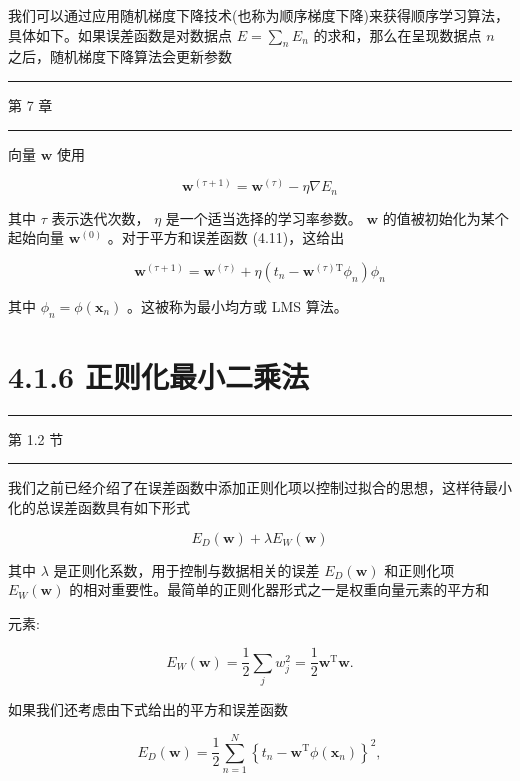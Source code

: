 \documentclass[10pt]{article}
\newcommand{\HRule}{\begin{center}\rule{0.9\linewidth}{0.2mm}\end{center}}
\begin{document}
我们可以通过应用随机梯度下降技术(也称为顺序梯度下降)来获得顺序学习算法，具体如下。如果误差函数是对数据点 \(E = \mathop{\sum }\limits_{n}{E}_{n}\) 的求和，那么在呈现数据点 \(n\) 之后，随机梯度下降算法会更新参数

\HRule

第 7 章

\HRule

向量 \(\mathbf{w}\) 使用

\[
{\mathbf{w}}^{\left( \tau  + 1\right) } = {\mathbf{w}}^{\left( \tau \right) } - \eta \nabla {E}_{n} \tag{4.21}
\]

其中 \(\tau\) 表示迭代次数， \(\eta\) 是一个适当选择的学习率参数。 \(\mathbf{w}\) 的值被初始化为某个起始向量 \({\mathbf{w}}^{\left( 0\right) }\) 。对于平方和误差函数 (4.11)，这给出

\[
{\mathbf{w}}^{\left( \tau  + 1\right) } = {\mathbf{w}}^{\left( \tau \right) } + \eta \left( {{t}_{n} - {\mathbf{w}}^{\left( \tau \right) \mathrm{T}}{\phi }_{n}}\right) {\phi }_{n} \tag{4.22}
\]

其中 \({\phi }_{n} = \phi \left( {\mathbf{x}}_{n}\right)\) 。这被称为最小均方或 LMS 算法。

\section*{4.1.6 正则化最小二乘法}

\HRule

第 1.2 节

\HRule

我们之前已经介绍了在误差函数中添加正则化项以控制过拟合的思想，这样待最小化的总误差函数具有如下形式

\[
{E}_{D}\left( \mathbf{w}\right)  + \lambda {E}_{W}\left( \mathbf{w}\right)  \tag{4.23}
\]

其中 \(\lambda\) 是正则化系数，用于控制与数据相关的误差 \({E}_{D}\left( \mathbf{w}\right)\) 和正则化项 \({E}_{W}\left( \mathbf{w}\right)\) 的相对重要性。最简单的正则化器形式之一是权重向量元素的平方和

元素:

\[
{E}_{W}\left( \mathbf{w}\right)  = \frac{1}{2}\mathop{\sum }\limits_{j}{w}_{j}^{2} = \frac{1}{2}{\mathbf{w}}^{\mathrm{T}}\mathbf{w}. \tag{4.24}
\]

如果我们还考虑由下式给出的平方和误差函数

\[
{E}_{D}\left( \mathbf{w}\right)  = \frac{1}{2}\mathop{\sum }\limits_{{n = 1}}^{N}{\left\{  {t}_{n} - {\mathbf{w}}^{\mathrm{T}}\phi \left( {\mathbf{x}}_{n}\right) \right\}  }^{2}, \tag{4.25}
\]
\end{document}
